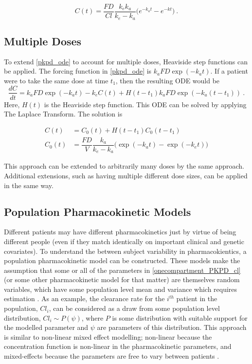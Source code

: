 \begin{equation}\label{onecompartment_PKPD_cl}
	C(t) = \dfrac{F D}{Cl}\dfrac{k_ek_a}{k_e - k_a}\Big(e^{-k_at} - e^{-kt}\Big) \>.
\end{equation}


\subsection{Multiple Doses}

To extend \cref{pkpd_ode} to account for multiple doses, Heaviside step functions can be applied.  The forcing function in \cref{pkpd_ode} is $ k_aFD\exp(-k_a t)$.  If a patient were to take the same dose at time $t_1$, then the resulting ODE would be
\begin{equation}  \label{pkpd_ode_2_doses}
	\dfrac{dC}{dt} = k_aFD\exp(-k_a t) - k_eC(t) + H(t-t_1)k_aFD\exp(-k_a (t-t_1)) \>.
\end{equation}
\noindent Here, $H(t)$ is the Heaviside step function.  This ODE can be solved by applying The Laplace Transform.  The solution is 

\begin{align*}
	C(t) &=  C_0(t) + H(t-t_1)C_0(t-t_1)\\
	C_0(t) &= \dfrac{F D}{V}\dfrac{k_a}{k_e - k_a}\Big(\exp(-k_at) - \exp(-k_et)\Big)
\end{align*}

\noindent  This approach can be extended to arbitrarily many doses by the same approach.  Additional extensions, such as having multiple different dose sizes, can be applied in the same way.


\subsection{Population Pharmacokinetic Models}


Different patients may have different pharmacokinetics just by virtue of being different people (even if they match identically on important clinical and genetic covariates).  To understand the between subject variability in pharmacokientics, a population pharmacokinetic model can be constructed.  These models make the assumption that some or all of the parameters in \cref{onecompartment_PKPD_cl} (or some other pharmacokinetic model for that matter) are themselves random variables, which have some population level mean and variance which requires estimation \cite{owen2014introduction}.  As an example, the clearance rate for the $i^{th}$ patient in the population, $Cl_i$, can be considered as a draw from some population level distribution, $Cl_i \sim P(\psi) $, where $P$ is some distribution with suitable support for the modelled parameter and $\psi$ are parameters of this distribution.  This approach is similar to non-linear mixed effect modelling; non-linear because the concentration function is non-linear in the pharmacokinetic parameters, and mixed-effects because the parameters are free to vary between patients \cite{owen2014introduction, mould2013basic}.

